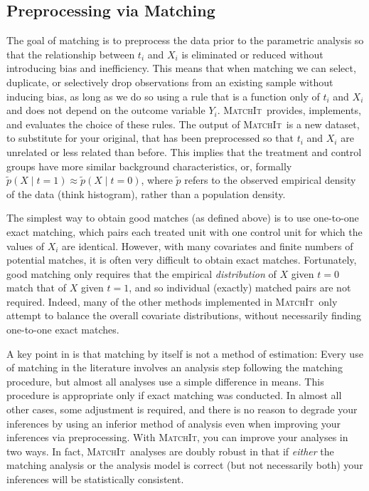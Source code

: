 \documentclass[oneside,letterpaper,titlepage]{article}
\newcommand{\MatchIt}{\textsc{MatchIt}}
\begin{document}
\subsection{Preprocessing via Matching}

The goal of matching is to preprocess the data prior to the parametric
analysis so that the relationship between $t_i$ and $X_i$ is
eliminated or reduced without introducing bias and inefficiency.  This
means that when matching we can select, duplicate, or selectively drop
observations from an existing sample without inducing bias, as long as
we do so using a rule that is a function only of $t_i$ and $X_i$ and
does not depend on the outcome variable $Y_i$.  \MatchIt\ provides,
implements, and evaluates the choice of these rules.  The output of
\MatchIt\ is a new dataset, to substitute for your original, that has
been preprocessed so that $t_i$ and $X_i$ are unrelated or less
related than before.  This implies that the treatment and control
groups have more similar background characteristics, or, formally
$\tilde p(X\mid t=1) \approx \tilde p(X\mid t=0)$, where $\tilde p$
refers to the observed empirical density of the data (think
histogram), rather than a population density.

The simplest way to obtain good matches (as defined above) is to use
one-to-one exact matching, which pairs each treated unit with one
control unit for which the values of $X_i$ are identical.  However,
with many covariates and finite numbers of potential matches, it is
often very difficult to obtain exact matches.  Fortunately, good
matching only requires that the empirical \emph{distribution} of $X$
given $t=0$ match that of $X$ given $t=1$, and so individual (exactly)
matched pairs are not required.  Indeed, many of the other methods
implemented in \MatchIt\ only attempt to balance the overall covariate
distributions, without necessarily finding one-to-one exact matches.

A key point in \citet*{HoImaKin05} is that matching by itself is not a
method of estimation: Every use of matching in the literature involves
an analysis step following the matching procedure, but almost all
analyses use a simple difference in means.  This procedure is
appropriate only if exact matching was conducted.  In almost all other
cases, some adjustment is required, and there is no reason to degrade
your inferences by using an inferior method of analysis even when
improving your inferences via preprocessing.  With \MatchIt, you can
improve your analyses in two ways.  In fact, \MatchIt\ analyses are
doubly robust in that if \emph{either} the matching analysis or the
analysis model is correct (but not necessarily both) your inferences
will be statistically consistent.
\end{document}
